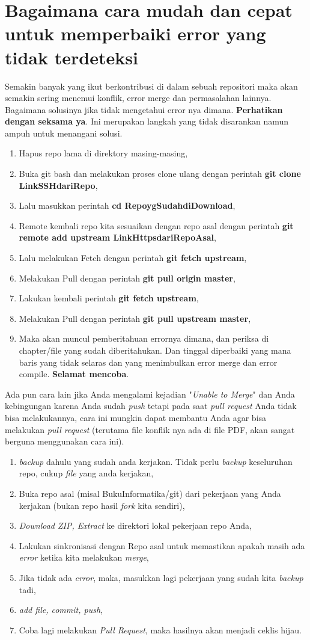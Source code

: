 \section{Bagaimana cara mudah dan cepat untuk memperbaiki error yang tidak terdeteksi}
Semakin banyak yang ikut berkontribusi di dalam sebuah repositori maka akan semakin sering menemui konflik, error merge dan permasalahan lainnya. Bagaimana solusinya jika tidak mengetahui error nya dimana. \textbf{Perhatikan dengan seksama ya}. Ini merupakan langkah yang tidak disarankan namun ampuh untuk menangani solusi.
\begin{enumerate}
\item Hapus repo lama di direktory masing-masing,
\item Buka git bash dan melakukan proses clone ulang dengan perintah \textbf{git clone LinkSSHdariRepo},
\item Lalu masukkan perintah \textbf{cd RepoygSudahdiDownload},
\item Remote kembali repo kita sesuaikan dengan repo asal dengan perintah \textbf{git remote add upstream LinkHttpsdariRepoAsal},
\item Lalu melakukan Fetch dengan perintah \textbf{git fetch upstream},
\item Melakukan Pull dengan perintah \textbf{git pull origin master},
\item Lakukan kembali perintah \textbf{git fetch upstream},
\item Melakukan Pull dengan perintah \textbf{git pull upstream master},
\item Maka akan muncul pemberitahuan errornya dimana, dan periksa di chapter/file yang sudah diberitahukan. Dan tinggal diperbaiki yang mana baris yang tidak selaras dan yang menimbulkan error merge dan error compile. \textbf{Selamat mencoba}.
\end{enumerate}
Ada pun cara lain jika Anda mengalami kejadian "\textit{Unable to Merge}" dan Anda kebingungan karena Anda sudah \textit{push} tetapi pada saat \textit{pull request} Anda tidak bisa melakukannya, cara ini mungkin dapat membantu Anda agar bisa melakukan \textit{pull request} (terutama file konflik nya ada di file PDF, akan sangat berguna menggunakan cara ini).
\begin{enumerate}
\item \textit{backup} dahulu yang sudah anda kerjakan. Tidak perlu \textit{backup} keseluruhan repo, cukup \textit{file} yang anda kerjakan,
\item Buka repo asal (misal BukuInformatika/git) dari pekerjaan yang Anda kerjakan (bukan repo hasil \textit{fork} kita sendiri),
\item \textit{Download ZIP, Extract} ke direktori lokal pekerjaan repo Anda,
\item Lakukan sinkronisasi dengan Repo asal untuk memastikan apakah masih ada \textit{error} ketika kita melakukan \textit{merge},
\item Jika tidak ada \textit{error}, maka, masukkan lagi pekerjaan yang sudah kita \textit{backup} tadi,
\item \textit{add file, commit, push},
\item Coba lagi melakukan \textit{Pull Request}, maka hasilnya akan menjadi ceklis hijau.
\end{enumerate}